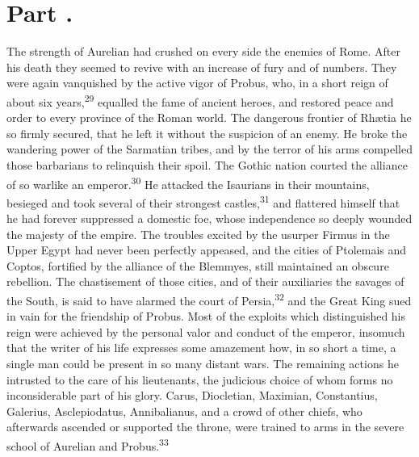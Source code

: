 



\section{Part \thesection.}

The strength of Aurelian had crushed on every side the enemies of
Rome. After his death they seemed to revive with an increase of
fury and of numbers. They were again vanquished by the active
vigor of Probus, who, in a short reign of about six years,\textsuperscript{29}
equalled the fame of ancient heroes, and restored peace and order
to every province of the Roman world. The dangerous frontier of
Rhætia he so firmly secured, that he left it without the
suspicion of an enemy. He broke the wandering power of the
Sarmatian tribes, and by the terror of his arms compelled those
barbarians to relinquish their spoil. The Gothic nation courted
the alliance of so warlike an emperor.\textsuperscript{30} He attacked the
Isaurians in their mountains, besieged and took several of their
strongest castles,\textsuperscript{31} and flattered himself that he had forever
suppressed a domestic foe, whose independence so deeply wounded
the majesty of the empire. The troubles excited by the usurper
Firmus in the Upper Egypt had never been perfectly appeased, and
the cities of Ptolemais and Coptos, fortified by the alliance of
the Blemmyes, still maintained an obscure rebellion. The
chastisement of those cities, and of their auxiliaries the
savages of the South, is said to have alarmed the court of
Persia,\textsuperscript{32} and the Great King sued in vain for the friendship of
Probus. Most of the exploits which distinguished his reign were
achieved by the personal valor and conduct of the emperor,
insomuch that the writer of his life expresses some amazement
how, in so short a time, a single man could be present in so many
distant wars. The remaining actions he intrusted to the care of
his lieutenants, the judicious choice of whom forms no
inconsiderable part of his glory. Carus, Diocletian, Maximian,
Constantius, Galerius, Asclepiodatus, Annibalianus, and a crowd
of other chiefs, who afterwards ascended or supported the throne,
were trained to arms in the severe school of Aurelian and Probus.\textsuperscript{33}

